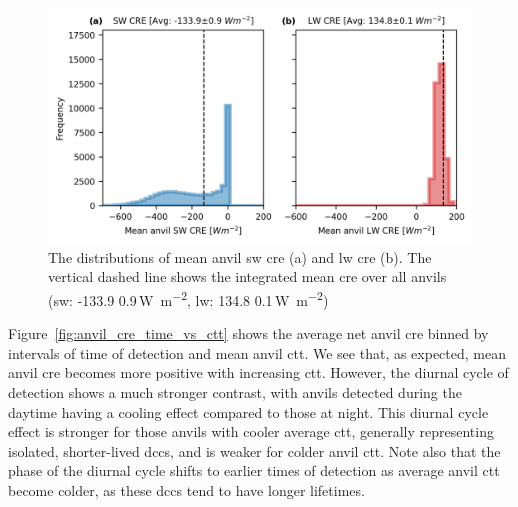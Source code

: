 \begin{figure}[tp]
    \includegraphics[width=\textwidth]{figures/ch3_12.png}
    \caption[
    The distributions of mean anvil \acrshort{sw} \acrshort{cre} and \acrshort{lw} \acrshort{cre}
    ]{
    The distributions of mean anvil \acrshort{sw} \acrshort{cre} (a) and \acrshort{lw} \acrshort{cre} (b). The vertical dashed line shows the integrated mean \acrshort{cre} over all anvils (\acrshort{sw}: -133.9\,\textpm\,0.9\,\unit{W m^{-2}}, \acrshort{lw}: 134.8\,\textpm\,0.1\,\unit{W m^{-2}})
    }
    \label{fig:anvil_sw_lw_cre}
\end{figure}


Figure~\ref{fig:anvil_cre_time_vs_ctt} shows the average net anvil \acrshort{cre} binned by intervals of time of
detection and mean anvil \acrshort{ctt}. We see that, as expected, mean anvil \acrshort{cre}
becomes more positive with increasing \acrshort{ctt}. However, the diurnal cycle of
detection shows a much stronger contrast, with anvils detected during
the daytime having a cooling effect compared to those at night. This
diurnal cycle effect is stronger for those anvils with cooler average
\acrshort{ctt}, generally representing isolated, shorter-lived \acrshort{dcc}s, and is weaker
for colder anvil \acrshort{ctt}. Note also that the phase of the diurnal cycle
shifts to earlier times of detection as average anvil \acrshort{ctt} become colder,
as these \acrshort{dcc}s tend to have longer lifetimes.


